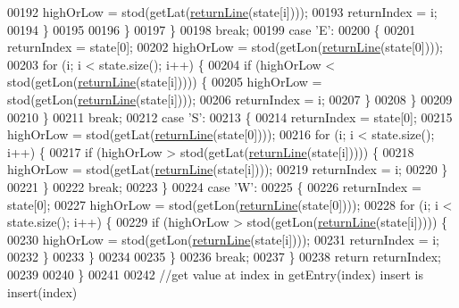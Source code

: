 \begin{DoxyCode}
00192                 highOrLow = stod(getLat(\hyperlink{classSSClass_ab0a8ea1af895df28359b5733bd920ef3}{returnLine}(state[i])));
00193                 returnIndex = i;
00194             \}
00195 
00196         \}
00197     \}
00198     \textcolor{keywordflow}{break};
00199     \textcolor{keywordflow}{case} \textcolor{charliteral}{'E'}:
00200     \{
00201         returnIndex = state[0];
00202         highOrLow = stod(getLon(\hyperlink{classSSClass_ab0a8ea1af895df28359b5733bd920ef3}{returnLine}(state[0])));
00203         \textcolor{keywordflow}{for} (i; i < state.size(); i++) \{
00204             \textcolor{keywordflow}{if} (highOrLow < stod(getLon(\hyperlink{classSSClass_ab0a8ea1af895df28359b5733bd920ef3}{returnLine}(state[i])))) \{
00205                 highOrLow = stod(getLon(\hyperlink{classSSClass_ab0a8ea1af895df28359b5733bd920ef3}{returnLine}(state[i])));
00206                 returnIndex = i;
00207             \}
00208         \}
00209         
00210     \}
00211     \textcolor{keywordflow}{break};
00212     \textcolor{keywordflow}{case} \textcolor{charliteral}{'S'}:
00213     \{
00214         returnIndex = state[0];
00215         highOrLow = stod(getLat(\hyperlink{classSSClass_ab0a8ea1af895df28359b5733bd920ef3}{returnLine}(state[0])));
00216         \textcolor{keywordflow}{for} (i; i < state.size(); i++) \{
00217             \textcolor{keywordflow}{if} (highOrLow > stod(getLat(\hyperlink{classSSClass_ab0a8ea1af895df28359b5733bd920ef3}{returnLine}(state[i])))) \{
00218                 highOrLow = stod(getLat(\hyperlink{classSSClass_ab0a8ea1af895df28359b5733bd920ef3}{returnLine}(state[i])));
00219                 returnIndex = i;
00220             \}
00221         \}
00222         \textcolor{keywordflow}{break};
00223     \}
00224     \textcolor{keywordflow}{case} \textcolor{charliteral}{'W'}:
00225     \{
00226         returnIndex = state[0];
00227         highOrLow = stod(getLon(\hyperlink{classSSClass_ab0a8ea1af895df28359b5733bd920ef3}{returnLine}(state[0])));
00228         \textcolor{keywordflow}{for} (i; i < state.size(); i++) \{
00229             \textcolor{keywordflow}{if} (highOrLow > stod(getLon(\hyperlink{classSSClass_ab0a8ea1af895df28359b5733bd920ef3}{returnLine}(state[i])))) \{
00230                 highOrLow = stod(getLon(\hyperlink{classSSClass_ab0a8ea1af895df28359b5733bd920ef3}{returnLine}(state[i])));
00231                 returnIndex = i;
00232             \}
00233         \}
00234 
00235     \}
00236     \textcolor{keywordflow}{break};
00237     \}
00238     \textcolor{keywordflow}{return} returnIndex;
00239 
00240 \}
00241 
00242 \textcolor{comment}{//get value at index in getEntry(index)         insert is insert(index)   }

\end{DoxyCode}
